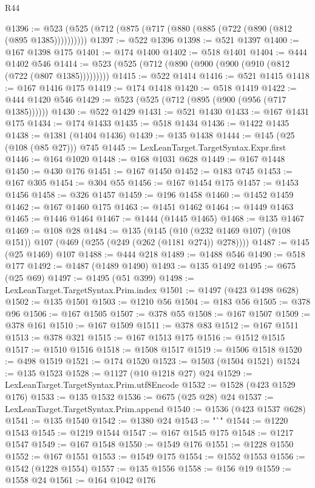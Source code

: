 \begin{lexlean}{R44}
\begin{coremodule}
@1396 := @523 (@525 (@712 (@875 (@717 (@880 (@885 (@722 (@890 (@812 (@895 @1385))))))))))
@1397 := @522 @1396
@1398 := @521 @1397
@1400 := @167 @1398 @175
@1401 := @174 @1400
@1402 := @518 @1401
@1404 := @444 @1402 @546
@1414 := @523 (@525 (@712 (@890 (@900 (@900 (@910 (@812 (@722 (@807 @1385)))))))))
@1415 := @522 @1414
@1416 := @521 @1415
@1418 := @167 @1416 @175
@1419 := @174 @1418
@1420 := @518 @1419
@1422 := @444 @1420 @546
@1429 := @523 (@525 (@712 (@895 (@900 (@956 (@717 @1385))))))
@1430 := @522 @1429
@1431 := @521 @1430
@1433 := @167 @1431 @175
@1434 := @174 @1433
@1435 := @518 @1434
@1436 := @1422 @1435
@1438 := @1381 (@1404 @1436)
@1439 := @135 @1438
@1444 := @145 (@25 (@108 (@85 @27))) @745
@1445 := LexLeanTarget.TargetSyntax.Expr.first
@1446 := @164 @1020
@1448 := @168 @1031 @628
@1449 := @167 @1448
@1450 := @430 @176
@1451 := @167 @1450
@1452 := @183 @745
@1453 := @167 @305
@1454 := @304 @55
@1456 := @167 @1454 @175
@1457 := @1453 @1456
@1458 := @326 @1457
@1459 := @196 @1458
@1460 := @1452 @1459
@1462 := @167 @1460 @175
@1463 := @1451 @1462
@1464 := @1449 @1463
@1465 := @1446 @1464
@1467 := @1444 (@1445 @1465)
@1468 := @135 @1467
@1469 := @108 @28
@1484 := @135
    (@145 (@10 (@232 @1469 @107) (@108 @151)) @107 (@469 (@255 (@249 (@262 (@1181 @274)) @278))))
@1487 := @145 (@25 @1469) @107
@1488 := @444 @218
@1489 := @1488 @546
@1490 := @518 @177
@1492 := @1487 (@1489 @1490)
@1493 := @135 @1492
@1495 := @675 (@25 @69)
@1497 := @1495 (@51 @399)
@1498 := LexLeanTarget.TargetSyntax.Prim.index
@1501 := @1497 (@423 @1498 @628)
@1502 := @135 @1501
@1503 := @1210 @56
@1504 := @183 @56
@1505 := @378 @96
@1506 := @167 @1505
@1507 := @378 @55
@1508 := @167 @1507
@1509 := @378 @161
@1510 := @167 @1509
@1511 := @378 @83
@1512 := @167 @1511
@1513 := @378 @321
@1515 := @167 @1513 @175
@1516 := @1512 @1515
@1517 := @1510 @1516
@1518 := @1508 @1517
@1519 := @1506 @1518
@1520 := @498 @1519
@1521 := @174 @1520
@1523 := @1503 (@1504 @1521)
@1524 := @135 @1523
@1528 := @1127 (@10 @1218 @27) @24
@1529 := LexLeanTarget.TargetSyntax.Prim.utf8Encode
@1532 := @1528 (@423 @1529 @176)
@1533 := @135 @1532
@1536 := @675 (@25 @28) @24
@1537 := LexLeanTarget.TargetSyntax.Prim.append
@1540 := @1536 (@423 @1537 @628)
@1541 := @135 @1540
@1542 := @1380 @24
@1543 := "`"
@1544 := @1220 @1543
@1545 := @1219 @1544
@1547 := @167 @1545 @175
@1548 := @1217 @1547
@1549 := @167 @1548
@1550 := @1549 @176
@1551 := @1228 @1550
@1552 := @167 @1551
@1553 := @1549 @175
@1554 := @1552 @1553
@1556 := @1542 (@1228 @1554)
@1557 := @135 @1556
@1558 := @156 @19
@1559 := @1558 @24
@1561 := @164 @1042 @176

\end{coremodule}
\end{lexlean}
